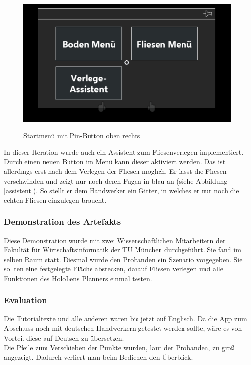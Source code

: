 \begin{figure}[h]
	\begin{center}
		\noindent\includegraphics[scale=0.4]{Resources/Artefakt/menue.png}
		\label{menue}
		\caption{Startmenü mit Pin-Button oben rechts}	
	\end{center}
\end{figure}

In dieser Iteration wurde auch ein Assistent zum Fliesenverlegen implementiert. Durch einen neuen Button im Menü kann dieser aktiviert werden. Das ist allerdings erst nach dem Verlegen der Fliesen möglich. Er lässt die Fliesen verschwinden und zeigt nur noch deren Fugen in blau an (siehe Abbildung \ref{assistent}). So stellt er dem Handwerker ein Gitter, in welches er nur noch die echten Fliesen einzulegen braucht.

\subsubsection{Demonstration des Artefakts}

Diese Demonstration wurde mit zwei Wissenschaftlichen Mitarbeitern der Fakultät für Wirtschaftsinformatik der TU München durchgeführt. Sie fand im selben Raum statt. Diesmal wurde den Probanden ein Szenario vorgegeben. Sie sollten eine festgelegte Fläche abstecken, darauf Fliesen verlegen und alle Funktionen des HoloLens Planners einmal testen.

\subsubsection{Evaluation}

Die Tutorialtexte und alle anderen waren bis jetzt auf Englisch. Da die App zum Abschluss noch mit deutschen Handwerkern getestet werden sollte, wäre es von Vorteil diese auf Deutsch zu übersetzen. \\
Die Pfeile zum Verschieben der Punkte wurden, laut der Probanden, zu groß angezeigt. Dadurch verliert man beim Bedienen den Überblick.

